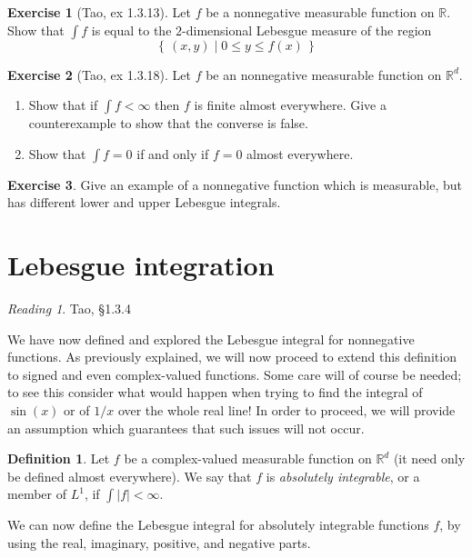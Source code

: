 \documentclass[11pt,oneside]{amsbook}
\newcommand{\set}[1]{\left\{\,#1\,\right\}}
\newcommand{\RR}{{\mathbb R}}
\theoremstyle{definition}
\newtheorem{exerc}{Exercise}[section]
\theoremstyle{plain}
\theoremstyle{definition}
\newtheorem{defn}[thm]{Definition}
\theoremstyle{remark}
\newtheorem*{reading}{Reading}
\numberwithin{equation}{section}
\numberwithin{figure}{section}
\begin{document}
\begin{exerc}[Tao, ex 1.3.13]
  Let $f$ be a nonnegative measurable function on $\RR$. Show that $\int f$ is equal to the $2$-dimensional Lebesgue measure of the region
  \[\set{(x,y)\mid 0\leq y\leq f(x)}
  \]
\end{exerc}

\begin{exerc}[Tao, ex 1.3.18]
  Let $f$ be an nonnegative measurable function on $\RR^d$.
  \begin{enumerate}
    \item Show that if $\int f<\infty$ then $f$ is finite almost everywhere. Give a counterexample to show that the converse is false.
    \item Show that $\int f=0$ if and only if $f=0$ almost everywhere.
  \end{enumerate}
\end{exerc}

\begin{exerc}
  Give an example of a nonnegative function which is measurable, but has different lower and upper Lebesgue integrals.
\end{exerc}

\newpage
\section{Lebesgue integration}

\begin{reading}
  Tao, \S 1.3.4
\end{reading}

We have now defined and explored the Lebesgue integral for nonnegative functions. As previously explained, we will now proceed to extend this definition to signed and even complex-valued functions. Some care will of course be needed; to see this consider what would happen when trying to find the integral of $\sin(x)$ or of $1/x$ over the whole real line! In order to proceed, we will provide an assumption which guarantees that such issues will not occur.

\begin{defn}
  Let $f$ be a complex-valued measurable function on $\RR^d$ (it need only be defined almost everywhere). We say that $f$ is \emph{absolutely integrable}, or a member of $L^1$, if $\int|f|<\infty$.
\end{defn}

We can now define the Lebesgue integral for absolutely integrable functions $f$, by using the real, imaginary, positive, and negative parts.
\end{document}
